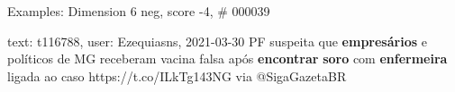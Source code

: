 \begin{frame}{Examples: Dimension 6 neg, score -4, \# 000039}
\footnotesize
\begin{alertblock}{text: t116788, user: Ezequiasns, 2021-03-30}
PF suspeita que \textbf{empresários} e políticos de MG receberam vacina falsa 
após \textbf{encontrar} \textbf{soro} com \textbf{enfermeira} ligada ao caso 
https://t.co/ILkTg143NG via @SigaGazetaBR 
\end{alertblock}
\end{frame}
